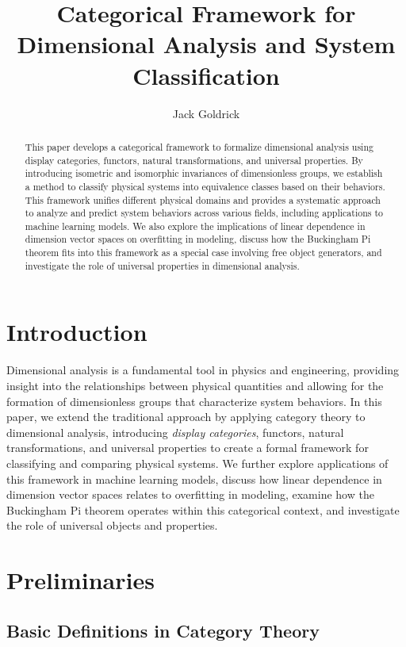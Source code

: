 \documentclass{article}
\title{Categorical Framework for Dimensional Analysis and System Classification}
\author{Jack Goldrick}
\date{}
\theoremstyle{definition}
\theoremstyle{remark}
\begin{document}
	
	\maketitle
	
	\begin{abstract}
		This paper develops a categorical framework to formalize dimensional analysis using display categories, functors, natural transformations, and universal properties. By introducing isometric and isomorphic invariances of dimensionless groups, we establish a method to classify physical systems into equivalence classes based on their behaviors. This framework unifies different physical domains and provides a systematic approach to analyze and predict system behaviors across various fields, including applications to machine learning models. We also explore the implications of linear dependence in dimension vector spaces on overfitting in modeling, discuss how the Buckingham Pi theorem fits into this framework as a special case involving free object generators, and investigate the role of universal properties in dimensional analysis.
	\end{abstract}
	
	\tableofcontents
	
	\section{Introduction}
	
	Dimensional analysis is a fundamental tool in physics and engineering, providing insight into the relationships between physical quantities and allowing for the formation of dimensionless groups that characterize system behaviors. In this paper, we extend the traditional approach by applying category theory to dimensional analysis, introducing \emph{display categories}, functors, natural transformations, and universal properties to create a formal framework for classifying and comparing physical systems. We further explore applications of this framework in machine learning models, discuss how linear dependence in dimension vector spaces relates to overfitting in modeling, examine how the Buckingham Pi theorem operates within this categorical context, and investigate the role of universal objects and properties.
	
	\section{Preliminaries}
	
	\subsection{Basic Definitions in Category Theory}
	
\end{document}
